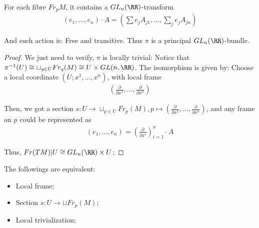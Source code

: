 \documentclass[Total.tex]{subfiles}
\begin{document}
			\begin{proposition}
				For each fibre $Fr_p M$, it contains a $GL_n(\RR)$-transform
				\begin{gather*}
					(e_1,\dots,e_n)\cdot A=(\sum e_j A_{j1},\dots,\sum_j e_j A_{jn})
				\end{gather*}
				
				And such action is: Free and transitive. Thus $\pi$ is a principal $GL_n(\RR)$-bundle. 
			\end{proposition}
			\begin{proof}
				We just need to verify, $\pi$ is locally trivial: Notice that $\pi^{-1}(U)\cong \sqcup_{q\in U} Fr_q(M)\cong U\times GL(n,\RR)$. The isomorphism is given by: Choose a local coordinate $(U;x^1,\dots,x^n)$, with local frame
				\begin{gather*}
					(\frac{\partial}{\partial x^1},\dots,\frac{\partial}{\partial x^n})
				\end{gather*}
				
				Then, we got a section $s:U\rightarrow \sqcup_{p\in U} Fr_p(M),p\mapsto (\frac{\partial}{\partial x^1},\dots,\frac{\partial}{\partial x^n})$, and any frame on $p$ could be represented as 
				\begin{gather*}
					(e_1,\dots,e_n)=(\frac{\partial}{\partial x^i})_{i=1}^n\cdot A
				\end{gather*}
				
				Thus, $Fr(TM)|U\cong GL_n(\RR)\times U$;
			\end{proof}
			The followings are equivalent:
			\begin{itemize}
				\item Local frame;
				\item Section $s:U\rightarrow \sqcup Fr_p(M)$;
				\item Local trivialization;
			\end{itemize}
			
\end{document}

